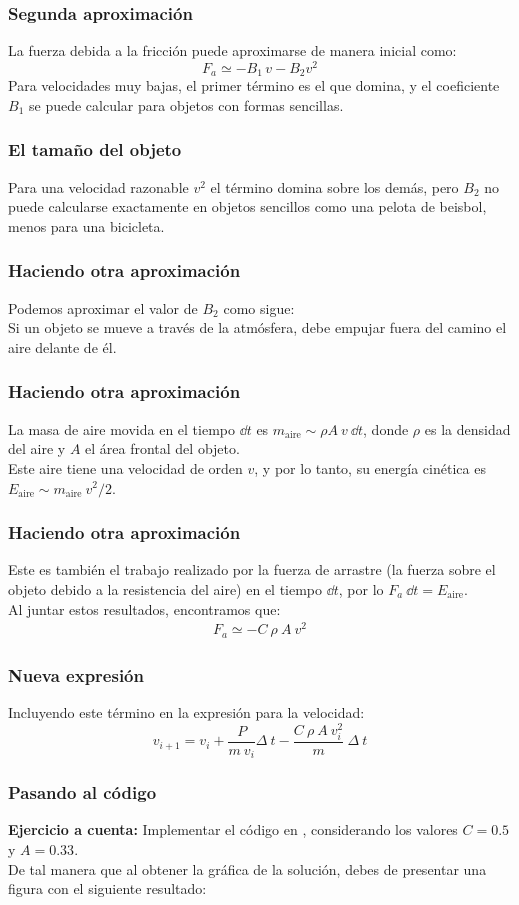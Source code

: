 \documentclass[12pt]{beamer}
\begin{document}
\begin{frame}
\frametitle{Segunda aproximación}
La fuerza debida a la fricción puede aproximarse de manera inicial como:
\pause
\begin{equation}
F_{a} \simeq - B_{1} \, v - B_{2} v^{2}
\label{EqFfriccion}
\end{equation}
Para velocidades muy bajas, el primer término es el que domina, y el coeficiente $B_{1}$ se puede calcular para objetos con formas sencillas.
\end{frame}
\begin{frame}
\frametitle{El tamaño del  objeto}
Para una velocidad razonable $v^{2}$ el término domina sobre los demás, pero $B_{2}$ no puede calcularse exactamente en objetos sencillos como una pelota de beisbol, menos para una bicicleta.
\end{frame}
\begin{frame}
\frametitle{Haciendo otra aproximación}
Podemos aproximar el valor de $B_{2}$ como sigue:
\\
\bigskip
\pause
Si un objeto se mueve a través de la atmósfera, debe empujar fuera del camino el aire delante de él. 
\end{frame}
\begin{frame}
\frametitle{Haciendo otra aproximación}
La masa de aire movida en el tiempo $\dd{t}$ es $m_{\text{aire}} \sim \rho A \: v \: \dd{t}$, donde $\rho$ 
es la densidad del aire y $A$ el área frontal del objeto.
\\
\bigskip
\pause
Este aire tiene una velocidad de orden $v$, y por lo tanto, su energía cinética es $E_{\text{aire}} \sim m_{\text{aire}} \: v^{2} / 2$.
\end{frame}
\begin{frame}
\frametitle{Haciendo otra aproximación}
Este es también el trabajo realizado por la fuerza de arrastre (la fuerza sobre el objeto debido a la resistencia del aire) en el tiempo $\dd{t}$, por lo $F_{a} \: \dd{t} = E_{\text{aire}}$.
\\
\bigskip
\pause
Al juntar estos resultados, encontramos que:
\pause
\begin{align*}
F_{a} \simeq - C \: \rho \: A \: v^{2}
\end{align*}
\end{frame}
\begin{frame}
\frametitle{Nueva expresión}
Incluyendo este término en la expresión para la velocidad:
\pause
\begin{equation}
v_{i+1} = v_{i} + \dfrac{P}{m \: v_{i}} \Delta \: t - \dfrac{C \: \rho \: A \: v_{i}^{2}}{m} \: \Delta \: t
\label{Eqvelifriccion}
\end{equation}
\end{frame}
\begin{frame}
\frametitle{Pasando al código}
\textbf{Ejercicio a cuenta: } Implementar el código en \python, considerando los valores $C = 0.5$ y $A=0.33$.
\\
\bigskip
\pause
De tal manera que al obtener la gráfica de la solución, debes de presentar una figura con el siguiente resultado:
\end{frame}
\end{document}
